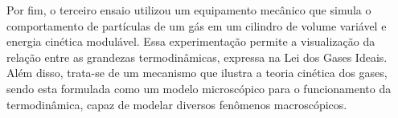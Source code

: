 Por fim, o terceiro ensaio utilizou um equipamento mecânico que simula o comportamento de partículas de um gás em um cilindro de volume variável e energia cinética modulável. Essa experimentação permite a visualização da relação entre as grandezas termodinâmicas, expressa na Lei dos Gases Ideais. Além disso, trata-se de um mecanismo que ilustra a teoria cinética dos gases, sendo esta formulada como um modelo microscópico para o funcionamento da termodinâmica, capaz de modelar diversos fenômenos macroscópicos\cite{Nussenzveig_2014}.
